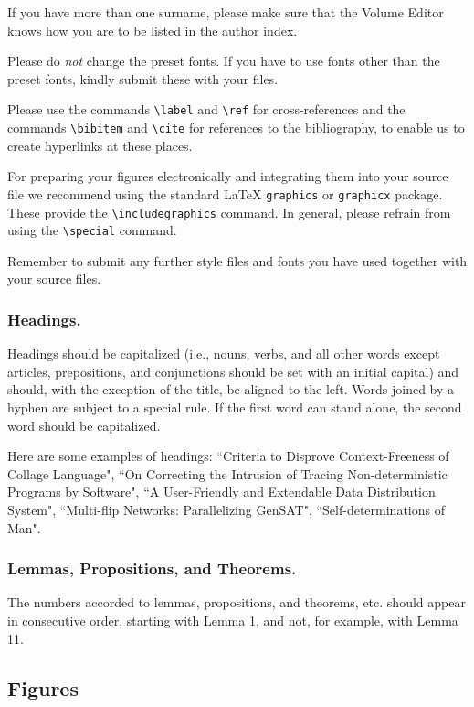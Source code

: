 \documentclass[runningheads,a4paper]{llncs}
\begin{document}
If you have more than one surname, please make sure that the Volume Editor
knows how you are to be listed in the author index.




Please do
\emph{not} change the preset fonts. If you have to use fonts other
than the preset fonts, kindly submit these with your files.

Please use the commands \verb+\label+ and \verb+\ref+ for
cross-references and the commands \verb+\bibitem+ and \verb+\cite+ for
references to the bibliography, to enable us to create hyperlinks at
these places.

For preparing your figures electronically and integrating them into
your source file we recommend using the standard \LaTeX{} \verb+graphics+ or
\verb+graphicx+ package. These provide the \verb+\includegraphics+ command.
In general, please refrain from using the \verb+\special+ command.

Remember to submit any further style files and
fonts you have used together with your source files.

\subsubsection{Headings.}

Headings should be capitalized
(i.e., nouns, verbs, and all other words
except articles, prepositions, and conjunctions should be set with an
initial capital) and should,
with the exception of the title, be aligned to the left.
Words joined by a hyphen are subject to a special rule. If the first
word can stand alone, the second word should be capitalized.

Here are some examples of headings: ``Criteria to Disprove
Context-Freeness of Collage Language", ``On Correcting the Intrusion of
Tracing Non-deterministic Programs by Software", ``A User-Friendly and
Extendable Data Distribution System", ``Multi-flip Networks:
Parallelizing GenSAT", ``Self-determinations of Man".

\subsubsection{Lemmas, Propositions, and Theorems.}

The numbers accorded to lemmas, propositions, and theorems, etc. should
appear in consecutive order, starting with Lemma 1, and not, for
example, with Lemma 11.

\subsection{Figures}
\end{document}
